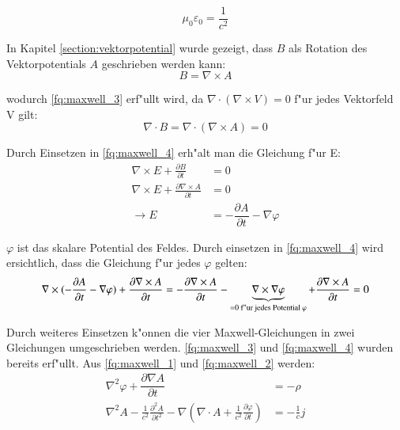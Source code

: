 \begin{equation*}
\mu_0\varepsilon_0=\frac{1}{c^2}
\end{equation*}

In Kapitel \ref{section:vektorpotential} wurde gezeigt, dass $B$ als Rotation des Vektorpotentials $A$ geschrieben werden kann:
\begin{equation*}
B = \nabla\times A 
\end{equation*}

wodurch \ref{fq:maxwell_3} erf"ullt wird, da $\nabla \cdot ( \nabla\times V ) = 0$ f"ur jedes Vektorfeld V gilt:
\begin{equation*}
\nabla \cdot B = \nabla \cdot ( \nabla\times A ) = 0
\end{equation*}

Durch Einsetzen in \ref{fq:maxwell_4} erh"alt man die Gleichung f"ur E:
\begin{equation*}
\begin{split}
\nabla\times E + \frac{\partial B }{\partial t} &= 0 \\
\nabla\times E + \frac{\partial \nabla\times A }{\partial t} &= 0 \\
\rightarrow E &= -\dfrac{\partial A}{\partial t} - \nabla \varphi
\end{split}
\end{equation*}

$\varphi$ ist das skalare Potential des Feldes. Durch einsetzen in \ref{fq:maxwell_4} wird ersichtlich, dass die Gleichung f"ur jedes $\varphi$ gelten:
\begin{equation*}
\nabla\times (-\dfrac{\partial A}{\partial t} - \nabla \varphi) + \frac{\partial \nabla\times A }{\partial t} = 
- \frac{\partial \nabla\times A }{\partial t} - \underbrace{\nabla\times \nabla \varphi}_{=0\text{ f"ur jedes Potential } \varphi} + \frac{\partial \nabla\times A }{\partial t} = 0\\
\end{equation*}

Durch weiteres Einsetzen k"onnen die vier Maxwell-Gleichungen in zwei Gleichungen umgeschrieben werden. \ref{fq:maxwell_3} und \ref{fq:maxwell_4} wurden bereits erf"ullt. Aus \ref{fq:maxwell_1} und \ref{fq:maxwell_2} werden:
\begin{align} 
 \label{fq:a_coupled_a}
 \nabla^2 \varphi + \dfrac{\partial \nabla A}{\partial t} &= -\rho \\
 \label{fq:a_coupled_b}
 \nabla^2 A - \frac{1}{c^2} \frac{\partial^2 A }{\partial t^2} - \nabla \left( \nabla \cdot A + \frac{1}{c^2} \frac{\partial \varphi }{\partial t} \right) &= - \frac{1}{c} j
\end{align}

